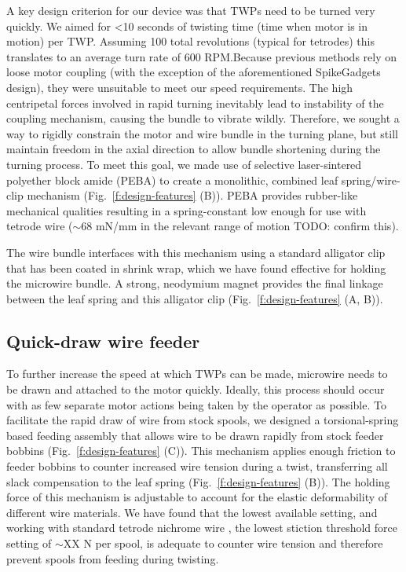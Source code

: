 \documentclass[11pt,a4paper]{article}
\begin{document}
A key design criterion for our device was that TWPs need to be turned very
quickly. We aimed for <10 seconds of twisting time (time when motor is in
motion) per TWP. Assuming 100 total revolutions (typical for tetrodes) this translates
to an average turn rate of 600 RPM.\@ Because previous methods rely on loose
motor coupling (with the exception of the aforementioned SpikeGadgets design),
they were unsuitable to meet our speed requirements. The high centripetal
forces involved in rapid turning inevitably lead to instability of the coupling
mechanism, causing the bundle to vibrate wildly. Therefore, we sought a way to
rigidly constrain the motor and wire bundle in the turning plane, but still
maintain freedom in the axial direction to allow bundle shortening during the
turning process. To meet this goal, we made use of selective laser-sintered
polyether block amide (PEBA) to create a monolithic, combined leaf
spring/wire-clip mechanism (Fig.~\ref{f:design-features} (B)). PEBA provides
rubber-like mechanical qualities resulting in a spring-constant low enough for
use with tetrode wire ($\sim$68 mN/mm in the relevant range of motion TODO:
confirm this).

The wire bundle interfaces with this mechanism using a standard alligator clip
that has been coated in shrink wrap, which we have found effective for holding
the microwire bundle. A strong, neodymium magnet provides the final linkage
between the leaf spring and this alligator clip (Fig.~\ref{f:design-features}
(A, B)).

\subsection{Quick-draw wire feeder}
To further increase the speed at which TWPs can be made, microwire needs to be
drawn and attached to the motor quickly. Ideally, this process should occur
with as few separate motor actions being taken by the operator as possible. To
facilitate the rapid draw of wire from stock spools, we designed a
torsional-spring based feeding assembly that allows wire to be drawn rapidly
from stock feeder bobbins (Fig.~\ref{f:design-features} (C)). This mechanism
applies enough friction to feeder bobbins to counter increased wire tension
during a twist, transferring all slack compensation to the leaf spring
(Fig.~\ref{f:design-features} (B)). The holding force of this mechanism is
adjustable to account for the elastic deformability of different wire
materials. We have found that the lowest available setting, and working with
standard tetrode nichrome wire \url{}, the lowest stiction threshold force
setting of $\sim$XX N per spool, is adequate to counter wire tension and
therefore prevent spools from feeding during twisting.
\end{document}
